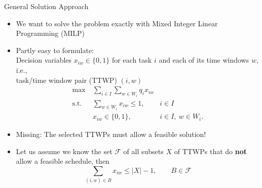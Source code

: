 \documentclass[aspectratio=1610]{beamer}
\newcommand{\important}[1]{{\color{green!60!black}#1}}
\begin{document}
\begin{frame}{General Solution Approach}
	\begin{itemize}
		\itemsep2ex
		\item We want to solve the problem exactly with \important{Mixed Integer Linear Programming (MILP)}
		\item \important{Partly easy to formulate:}\\
		Decision variables $x_{iw}\in\{0,1\}$ for each task $i$ and each of its time windows $w$, i.e.,\\
		\important{task/time window pair (TTWP) $(i,w)$}
		\begin{align}
			\max                ~ & \sum_{i\in I}\sum_{w\in W_{i}} q_{i}x_{iw} \label{eq:sms_objective_function} \\
			\operatorname{s.t.} ~ & \sum_{w\in W_{i}} x_{iw} \leq 1, & i\in I \label{eq:sms_at_most_one_time_window_per_task} \\
			~ & x_{iw} \in \{0, 1\}, & i \in I,\ w \in W_{i}.
		\end{align}
		\item<2-> \alert{Missing: The selected TTWPs must allow a feasible solution!} 
		\item<3> Let us assume we know the set $\mathcal{F}$ of \important{all subsets $X$ of TTWPs that do \textbf{not} allow a feasible schedule}, then
		\alert{\begin{equation}
		\sum_{(i, w) \in B} x_{iw} \le |X|-1, \qquad B \in \mathcal{F}
		\end{equation}}
	\end{itemize}
\end{frame}
\end{document}
